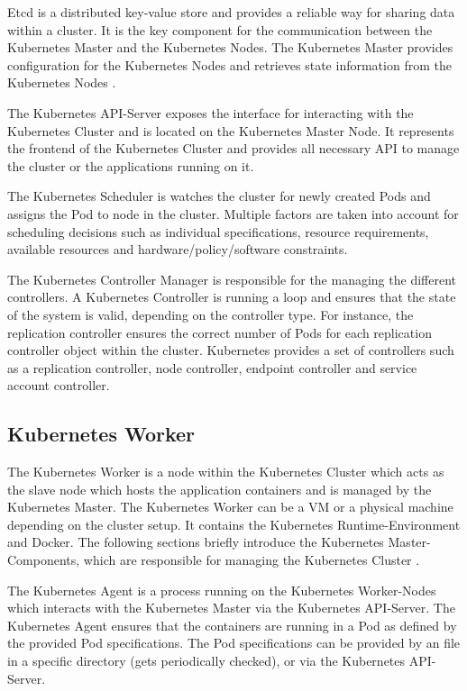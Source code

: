 Etcd is a distributed key-value store and provides a reliable way for sharing data within a cluster. It is the key component for the communication between the Kubernetes Master and the Kubernetes Nodes. The Kubernetes Master provides configuration for the Kubernetes Nodes and retrieves state information from the Kubernetes Nodes \cite{CoreOSETCD2018}.

The Kubernetes API-Server exposes the interface for interacting with the Kubernetes Cluster and is located on the Kubernetes Master Node. It represents the frontend of the Kubernetes Cluster and provides all necessary API to manage the cluster or the applications running on it.

The Kubernetes Scheduler is watches the cluster for newly created Pods and assigns the Pod to node in the cluster. Multiple factors are taken into account for scheduling decisions such as individual specifications, resource requirements, available resources and hardware/policy/software constraints.

The Kubernetes Controller Manager is responsible for the managing the different controllers. A Kubernetes Controller is running a loop and ensures that the state of the system is valid, depending on the controller type. For instance, the replication controller ensures the correct number of Pods for each replication controller object within the cluster. Kubernetes provides a set of controllers such as a replication controller, node controller, endpoint controller and service account controller.

\subsection{Kubernetes Worker}
\label{sec:caas-kubernetes-worker}
The Kubernetes Worker is a node within the Kubernetes Cluster which acts as the slave node which hosts the application containers and is managed by the Kubernetes Master. The Kubernetes Worker can be a VM or a physical machine depending on the cluster setup. It contains the Kubernetes Runtime-Environment and Docker. The following sections briefly introduce the Kubernetes Master-Components, which are responsible for managing the Kubernetes Cluster \cite{CNCFKubernetesComponents2018}. 

The Kubernetes Agent is a process running on the Kubernetes Worker-Nodes which interacts with the Kubernetes Master via the Kubernetes API-Server. The Kubernetes Agent ensures that the containers are running in a Pod as defined by the provided Pod specifications. The Pod specifications can be provided by an file in a specific directory (gets periodically checked), or via the Kubernetes API-Server.

